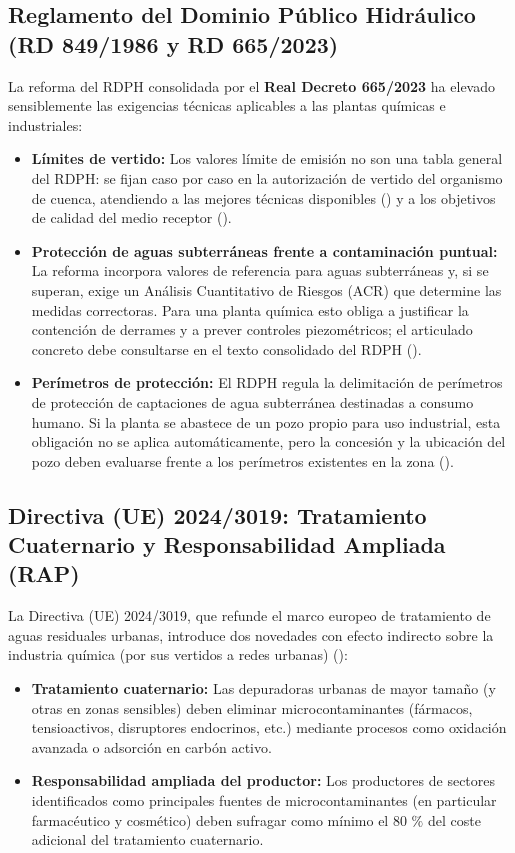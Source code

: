 \documentclass{report}
\begin{document}
\subsection{Reglamento del Dominio Público Hidráulico (RD 849/1986 y RD 665/2023)}
La reforma del RDPH consolidada por el \textbf{Real Decreto 665/2023} ha elevado sensiblemente las exigencias técnicas aplicables a las plantas químicas e industriales:
\begin{itemize}
    \item \textbf{Límites de vertido:} Los valores límite de emisión no son una tabla general del RDPH: se fijan caso por caso en la autorización de vertido del organismo de cuenca, atendiendo a las mejores técnicas disponibles (\cite{CWW_BREF_2016}) y a los objetivos de calidad del medio receptor (\cite{TRLA2001, RDPH1986}).
    \item \textbf{Protección de aguas subterráneas frente a contaminación puntual:} La reforma incorpora valores de referencia para aguas subterráneas y, si se superan, exige un Análisis Cuantitativo de Riesgos (ACR) que determine las medidas correctoras. Para una planta química esto obliga a justificar la contención de derrames y a prever controles piezométricos; el articulado concreto debe consultarse en el texto consolidado del RDPH (\cite{RDPH1986}).
    \item \textbf{Perímetros de protección:} El RDPH regula la delimitación de perímetros de protección de captaciones de agua subterránea destinadas a consumo humano. Si la planta se abastece de un pozo propio para uso industrial, esta obligación no se aplica automáticamente, pero la concesión y la ubicación del pozo deben evaluarse frente a los perímetros existentes en la zona (\cite{RDPH1986}).
\end{itemize}

\subsection{Directiva (UE) 2024/3019: Tratamiento Cuaternario y Responsabilidad Ampliada (RAP)}
La Directiva (UE) 2024/3019, que refunde el marco europeo de tratamiento de aguas residuales urbanas, introduce dos novedades con efecto indirecto sobre la industria química (por sus vertidos a redes urbanas) (\cite{DirectivaUE_2024_3019}):
\begin{itemize}
    \item \textbf{Tratamiento cuaternario:} Las depuradoras urbanas de mayor tamaño (y otras en zonas sensibles) deben eliminar microcontaminantes (fármacos, tensioactivos, disruptores endocrinos, etc.) mediante procesos como oxidación avanzada o adsorción en carbón activo.
    \item \textbf{Responsabilidad ampliada del productor:} Los productores de sectores identificados como principales fuentes de microcontaminantes (en particular farmacéutico y cosmético) deben sufragar como mínimo el $80\text{ \%}$ del coste adicional del tratamiento cuaternario.
\end{itemize}
\end{document}
